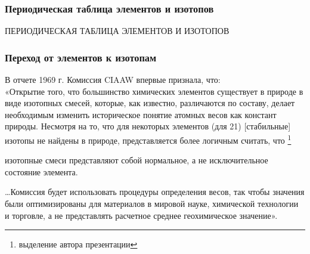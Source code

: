 
\begin{frame}
\frametitle{Периодическая таблица элементов и изотопов}


\begin{center}
	ПЕРИОДИЧЕСКАЯ ТАБЛИЦА ЭЛЕМЕНТОВ И ИЗОТОПОВ
\end{center}

\end{frame}


\begin{frame}
	\frametitle{Переход от элементов к изотопам}
	
В отчете 1969 г. Комиссия CIAAW впервые признала, что:\\
«Открытие того, что большинство химических элементов существует в природе в виде изотопных смесей,
которые, как известно, различаются по составу, делает необходимым изменить историческое
понятие атомных весов как констант природы. 
Несмотря на то, что для некоторых элементов (для 21) [стабильные] изотопы не найдены в природе, представляется более логичным считать, что \footnote{выделение автора презентации}
\begin{center}
{\color{red}	изотопные смеси представляют собой нормальное, а не исключительное состояние элемента. }
\end{center} 
\ldots Комиссия будет использовать процедуры определения весов, так чтобы значения были оптимизированы для
материалов в мировой науке, химической технологии и торговле, а не представлять расчетное среднее геохимическое значение».
	
\end{frame}

